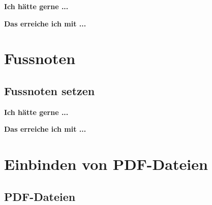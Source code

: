 \documentclass[twoside, 
               a4paper, 
               10pt, 
               parskip=full, 
               sectionentrydots=true, 
               listof=totoc, 
               listof=entryprefix,
               numbers=endperiod]{scrartcl}
\begin{document}
{\textbf {Ich hätte gerne ...}}
 
\begin{miniSeite}[colbacktitle=black!35!white,title=Ausdruck]

\end{miniSeite}


\newpage
{\textbf {Das erreiche ich mit ...}}
 
\begin{miniSeite}[colbacktitle=black!35!white,title=\LaTeX-Code]

\end{miniSeite}





\newpage
\section{Fussnoten}
\subsection{Fussnoten setzen}

{\textbf {Ich hätte gerne ...}}
 
\begin{miniSeite}[colbacktitle=black!35!white,title=Ausdruck]

\end{miniSeite}


\newpage
{\textbf {Das erreiche ich mit ...}}
 
\begin{miniSeite}[colbacktitle=black!35!white,title=\LaTeX-Code]

\end{miniSeite}





\newpage
\section{Einbinden von PDF-Dateien}
\subsection{PDF-Dateien}
\end{document}
